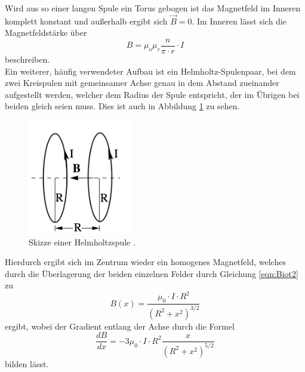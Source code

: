 \noindent Wird aus so einer langen Spule ein Torus gebogen ist das Magnetfeld im
Inneren komplett konstant und außerhalb ergibt sich $ \vec{B} = 0$. Im Inneren
lässt sich die Magnetfeldstärke über
\begin{equation}
    B= \mu_o \mu_r \frac{n}{\pi \cdot r} \cdot I
    \label{eqn:torus}
  \end{equation}
  beschreiben.\\


  \noindent Ein weiterer, häufig verwendeter Aufbau ist ein Helmholtz-Spulenpaar,
  bei dem zwei Kreispulen mit gemeinsamer Achse genau in dem Abstand zueinander
  aufgestellt werden, welcher dem Radius der Spule entspricht, der im Übrigen
  bei beiden gleich seien muss. Dies ist auch in Abbildung \ref{fig:helm} zu sehen.
  \begin{figure}[H]
    \centering
    \includegraphics[height=5cm]{Helmholtz.png}
    \caption{Skizze einer Helmholtzspule \cite{skript}.}
    \label{fig:helm}
  \end{figure}

  \noindent Hierdurch ergibt sich im Zentrum wieder ein homogenes
  Magnetfeld, welches durch die Überlagerung der beiden einzelnen Felder durch Gleichung
  \ref{eqn:Biot2} zu
  \begin{equation}
    B(x)= \frac{\mu_0 \cdot I \cdot R^2}{(R^2 + x^2)^{3/2}}
    \label{eqn:Helmholtz}
  \end{equation}
  ergibt, wobei der Gradient entlang der Achse durch die Formel
  \begin{equation}
    \frac{dB}{dx} = -3\mu_0 \cdot I \cdot R^2 \frac{x}{(R^2+x^2)^{5/2}}
    \label{eqn:gradient}
  \end{equation}
bilden lässt. \\


